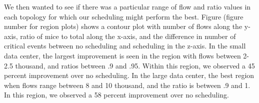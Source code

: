 We then wanted to see if there was a particular range of flow and ratio values
in each topology for which our scheduling might perform the best. Figure
(figure number for region plots) shows a contour plot with number of flows along
the y-axis, ratio of mice to total along the x-axis, and the difference in
number of critical events between no scheduling and scheduling in the z-axis. In
the small data center, the largest improvement is seen in the region with flows
between 2-2.5 thousand, and ratios between .9 and .95. Within this region, we
observed a 45 percent improvement over no scheduling. In the large data center,
the best region when flows range between 8 and 10 thousand, and the ratio is
between .9 and 1. In this region, we observed a 58 percent improvement over no
scheduling.
